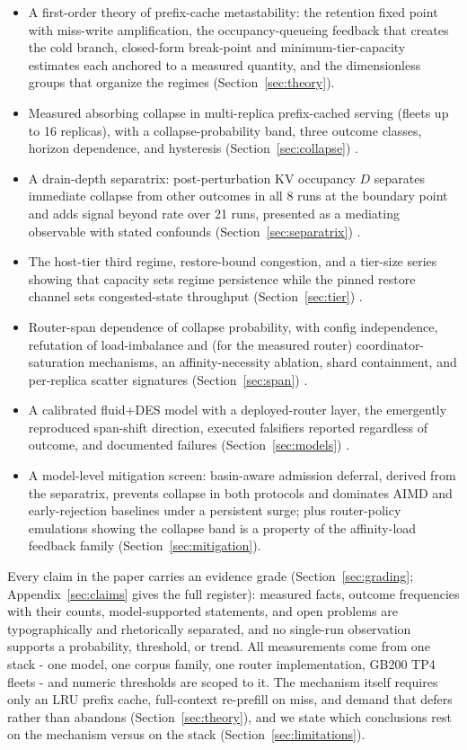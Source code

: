 \begin{itemize}
\item A first-order theory of prefix-cache metastability: the retention
  fixed point with miss-write amplification, the occupancy-queueing
  feedback that creates the cold branch, closed-form break-point and
  minimum-tier-capacity estimates each anchored to a measured
  quantity, and the dimensionless groups that organize the regimes
  (Section~\ref{sec:theory}).
\item Measured absorbing collapse in multi-replica prefix-cached serving
  (fleets up to 16 replicas), with a collapse-probability band,
  three outcome classes, horizon dependence, and hysteresis
  (Section~\ref{sec:collapse}) .
\item A drain-depth separatrix: post-perturbation KV occupancy $D$
  separates immediate collapse from other outcomes in all 8 runs at
  the boundary point and adds signal beyond rate over 21 runs,
  presented as a mediating observable with stated confounds
  (Section~\ref{sec:separatrix}) .
\item The host-tier third regime, restore-bound congestion, and a
  tier-size series showing that capacity sets regime persistence
  while the pinned restore channel sets congested-state throughput
  (Section~\ref{sec:tier}) .
\item Router-span dependence of collapse probability, with config
  independence, refutation of load-imbalance and (for the measured
  router) coordinator-saturation mechanisms, an affinity-necessity
  ablation, shard containment, and per-replica scatter signatures
  (Section~\ref{sec:span}) .
\item A calibrated fluid+DES model with a deployed-router layer, the
  emergently reproduced span-shift direction, executed falsifiers
  reported regardless of outcome, and documented failures
  (Section~\ref{sec:models}) .
\item A model-level mitigation screen: basin-aware admission deferral,
  derived from the separatrix, prevents collapse in both protocols
  and dominates AIMD and early-rejection baselines under a
  persistent surge; plus router-policy emulations showing the
  collapse band is a property of the affinity-load feedback family
  (Section~\ref{sec:mitigation}).
\end{itemize}

Every claim in the paper carries an evidence grade (Section~\ref{sec:grading};
Appendix~\ref{sec:claims} gives the full register): measured facts, outcome
frequencies with their counts, model-supported statements, and open
problems are typographically and rhetorically separated, and no
single-run observation supports a probability, threshold, or trend.
All measurements come from one stack - one model, one corpus family,
one router implementation, GB200 TP4 fleets - and numeric thresholds
are scoped to it. The mechanism itself requires only an LRU prefix
cache, full-context re-prefill on miss, and demand that defers
rather than abandons (Section~\ref{sec:theory}), and we state which conclusions
rest on the mechanism versus on the stack (Section~\ref{sec:limitations}).
